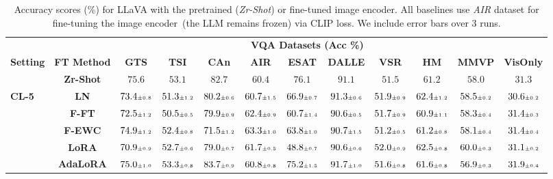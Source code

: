 \begin{table}
\caption{Accuracy scores (\%) for LLaVA with the pretrained (\emph{Zr-Shot}) or fine-tuned image encoder. All baselines use \emph{AIR} dataset for fine-tuning the image encoder~(the LLM remains frozen) via CLIP loss. We include error bars over 3 runs.}
 \label{table:vlm_vqa_acc_aircraft_clip}
\vskip 0.15in
\begin{center}
\begin{small}
\begingroup
\setlength{\tabcolsep}{3.9pt}
\begin{tabular}{l c c c c c c c c c c c}
\toprule
 & & \multicolumn{9}{c}{\textbf{VQA Datasets (Acc \%)}}  \\
\cmidrule(lr){3-12}
\textbf{Setting} & \textbf{FT Method}  & \textbf{GTS} & \textbf{TSI} & \textbf{CAn} & \textbf{AIR} & \textbf{ESAT} & \textbf{DALLE} & \textbf{VSR} & \textbf{HM} & \textbf{MMVP} & \textbf{VisOnly} \\
\midrule
 & \textbf{Zr-Shot} & $75.6$ & $53.1$ & $82.7$ & $60.4$ & $76.1$ & $91.1$ & $51.5$ & $61.2$ & $58.0$ & $31.3$ \\
\midrule
\multirow{7}{*}{\textbf{CL-5}} & \textbf{LN} & $73.4 \mbox{\tiny\ensuremath{\pm 0.8}}$ & $51.3 \mbox{\tiny\ensuremath{\pm 1.2}}$ & $80.2 \mbox{\tiny\ensuremath{\pm 0.6}}$ & $60.7 \mbox{\tiny\ensuremath{\pm 1.5}}$ & $66.9 \mbox{\tiny\ensuremath{\pm 0.7}}$ & $91.3 \mbox{\tiny\ensuremath{\pm 0.6}}$ & $51.9 \mbox{\tiny\ensuremath{\pm 0.9}}$ & $62.4 \mbox{\tiny\ensuremath{\pm 1.2}}$ & $58.5 \mbox{\tiny\ensuremath{\pm 0.2}}$ & $30.6 \mbox{\tiny\ensuremath{\pm 0.2}}$ \\
& \textbf{F-FT} & $72.5 \mbox{\tiny\ensuremath{\pm 1.2}}$ & $50.5 \mbox{\tiny\ensuremath{\pm 0.5}}$ & $79.9 \mbox{\tiny\ensuremath{\pm 0.9}}$ & $62.4 \mbox{\tiny\ensuremath{\pm 0.9}}$ & $60.7 \mbox{\tiny\ensuremath{\pm 1.4}}$ & $90.6 \mbox{\tiny\ensuremath{\pm 0.5}}$ & $51.7 \mbox{\tiny\ensuremath{\pm 0.9}}$ & $60.9 \mbox{\tiny\ensuremath{\pm 1.1}}$ & $58.3 \mbox{\tiny\ensuremath{\pm 0.4}}$ & $31.4 \mbox{\tiny\ensuremath{\pm 0.3}}$ \\
& \textbf{F-EWC} & $74.9 \mbox{\tiny\ensuremath{\pm 1.2}}$ & $52.4 \mbox{\tiny\ensuremath{\pm 0.8}}$ & $71.5 \mbox{\tiny\ensuremath{\pm 1.2}}$ & $63.3 \mbox{\tiny\ensuremath{\pm 1.0}}$ & $63.8 \mbox{\tiny\ensuremath{\pm 1.0}}$ & $90.7 \mbox{\tiny\ensuremath{\pm 1.5}}$ & $51.2 \mbox{\tiny\ensuremath{\pm 0.5}}$ & $61.2 \mbox{\tiny\ensuremath{\pm 0.8}}$ & $58.1 \mbox{\tiny\ensuremath{\pm 0.4}}$ & $31.4 \mbox{\tiny\ensuremath{\pm 0.4}}$ \\
& \textbf{LoRA} & $70.9 \mbox{\tiny\ensuremath{\pm 0.9}}$ & $52.7 \mbox{\tiny\ensuremath{\pm 0.6}}$ & $79.0 \mbox{\tiny\ensuremath{\pm 0.7}}$ & $61.7 \mbox{\tiny\ensuremath{\pm 0.5}}$ & $48.8 \mbox{\tiny\ensuremath{\pm 0.7}}$ & $90.6 \mbox{\tiny\ensuremath{\pm 0.6}}$ & $52.0 \mbox{\tiny\ensuremath{\pm 0.9}}$ & $62.5 \mbox{\tiny\ensuremath{\pm 0.8}}$ & $60.0 \mbox{\tiny\ensuremath{\pm 0.3}}$ & $31.1 \mbox{\tiny\ensuremath{\pm 0.2}}$ \\
& \textbf{AdaLoRA} & $75.0 \mbox{\tiny\ensuremath{\pm 1.0}}$ & $53.3 \mbox{\tiny\ensuremath{\pm 0.8}}$ & $83.7 \mbox{\tiny\ensuremath{\pm 0.9}}$ & $60.8 \mbox{\tiny\ensuremath{\pm 0.8}}$ & $75.2 \mbox{\tiny\ensuremath{\pm 1.5}}$ & $91.7 \mbox{\tiny\ensuremath{\pm 1.0}}$ & $51.6 \mbox{\tiny\ensuremath{\pm 0.8}}$ & $61.6 \mbox{\tiny\ensuremath{\pm 0.8}}$ & $56.9 \mbox{\tiny\ensuremath{\pm 0.3}}$ & $31.9 \mbox{\tiny\ensuremath{\pm 0.4}}$ \\

\end{tabular}
\end{small}
\end{center}
\end{table}
